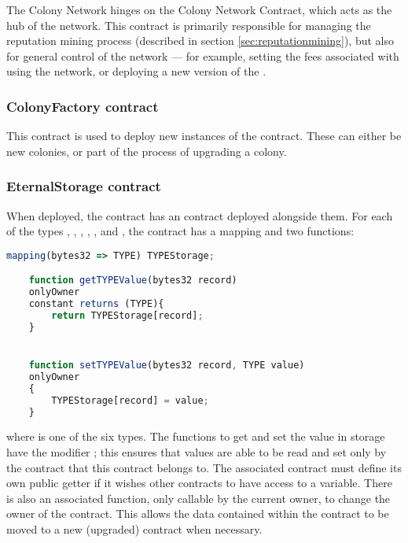 The Colony Network hinges on the Colony Network Contract, which acts as the hub of the network. This contract is primarily responsible for managing the reputation mining process (described in section \ref{sec:reputationmining}), but also for general control of the network --- for example, setting the fees associated with using the network, or deploying a new version of the .

\subsubsection {ColonyFactory contract}
This contract is used to deploy new instances of the  contract. These can either be new colonies, or part of the process of upgrading a colony.

\subsubsection {EternalStorage contract}

When deployed, the   contract has an  contract deployed alongside them. For each of the types , , , , , and , the  contract has a mapping and two functions:

\begin{minipage}[c]{0.9\linewidth}
\begin{lstlisting}[language=JavaScript]
    mapping(bytes32 => TYPE) TYPEStorage;

    function getTYPEValue(bytes32 record)
    onlyOwner 
    constant returns (TYPE){
        return TYPEStorage[record];
    }


    function setTYPEValue(bytes32 record, TYPE value)
    onlyOwner
    {
        TYPEStorage[record] = value;
    }
\end{lstlisting}
\end{minipage}

\noindent where  is one of the six types. The functions to get and set the value in storage have the modifier ; this ensures that values are able to be read and set only by the contract that this  contract belongs to. The associated contract must define its own public getter if it wishes other contracts to have access to a variable. There is also an associated  function, only callable by the current owner, to change the owner of the contract. This allows the data contained within the contract to be moved to a new (upgraded) contract when necessary. 

